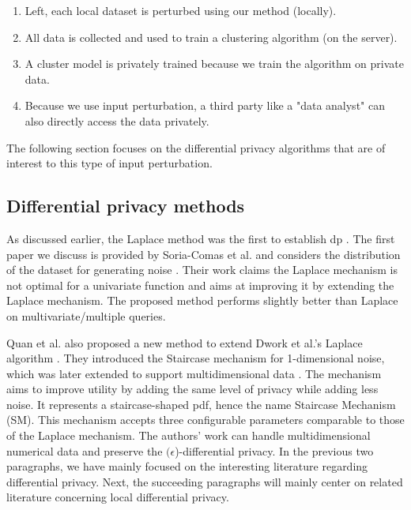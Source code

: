 \begin{enumerate}
  \item Left, each local dataset is perturbed using our method (locally).
  \item All data is collected and used to train a clustering algorithm (on the server).
  \item A cluster model is privately trained because we train the algorithm on private data.
  \item Because we use input perturbation, a third party like a "data analyst" can also directly access the data privately.
\end{enumerate}
The following section focuses on the differential privacy algorithms that are of interest to this type of input perturbation.

\newpage
\subsection{Differential privacy methods}
As discussed earlier, the Laplace method was the first to establish \gls{dp} \citep{dwork_differential_2006}.
The first paper we discuss is provided by Soria-Comas et al. and considers the distribution of the dataset for generating noise \citep{soria-comas_optimal_2013}.
Their work claims the Laplace mechanism is not optimal for a univariate function and aims at improving it by extending the Laplace mechanism.
The proposed method performs slightly better than Laplace on multivariate/multiple queries.

Quan et al. also proposed a new method to extend Dwork et al.'s Laplace algorithm \citep{geng_staircase_2015}.
They introduced the Staircase mechanism for 1-dimensional noise, which was later extended to support multidimensional data \citep{geng_staircase_2015}.
The mechanism aims to improve utility by adding the same level of privacy while adding less noise.
It represents a staircase-shaped \gls{pdf}, hence the name Staircase Mechanism (SM).
This mechanism accepts three configurable parameters comparable to those of the Laplace mechanism.
The authors' work can handle multidimensional numerical data and preserve the  $(\epsilon$)-differential privacy.
In the previous two paragraphs, we have mainly focused on the interesting literature regarding differential privacy.
Next, the succeeding paragraphs will mainly center on related literature concerning local differential privacy.\newline

